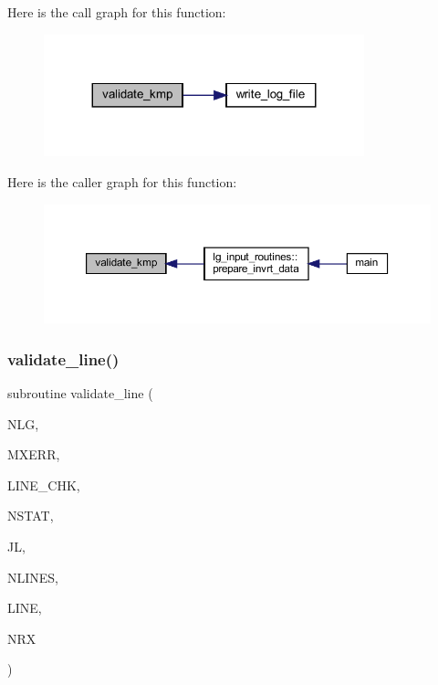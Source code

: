 Here is the call graph for this function\+:\nopagebreak
\begin{figure}[H]
\begin{center}
\leavevmode
\includegraphics[width=263pt]{Leroi_8f90_a2cd90fa43f6deaeb4a86b02b8494d638_cgraph}
\end{center}
\end{figure}
Here is the caller graph for this function\+:\nopagebreak
\begin{figure}[H]
\begin{center}
\leavevmode
\includegraphics[width=350pt]{Leroi_8f90_a2cd90fa43f6deaeb4a86b02b8494d638_icgraph}
\end{center}
\end{figure}
\mbox{\label{Leroi_8f90_aac9f78ba0dc05544c1babba6dc4ac636}} 
\subsubsection{\texorpdfstring{validate\+\_\+line()}{validate\_line()}}
{\footnotesize\ttfamily subroutine validate\+\_\+line (\begin{DoxyParamCaption}\item[{integer}]{N\+LG,  }\item[{integer}]{M\+X\+E\+RR,  }\item[{integer}]{L\+I\+N\+E\+\_\+\+C\+HK,  }\item[{integer}]{N\+S\+T\+AT,  }\item[{integer}]{JL,  }\item[{integer}]{N\+L\+I\+N\+ES,  }\item[{integer, dimension(nlines)}]{L\+I\+NE,  }\item[{integer, dimension(nlines)}]{N\+RX }\end{DoxyParamCaption})}

